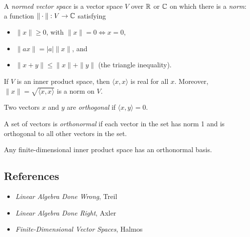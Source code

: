 \begin{defn}
  A \emph{normed vector space} is a vector space $V$ over $\mathbb{R}$ or $\mathbb{C}$
  on which there is a \emph{norm}: a function $\|\cdot\|:V\to\mathbb{C}$ satisfying
  \begin{itemize}
    \item $\| x\|\ge 0$, with $\|x\|=0\iff x=0$,
    \item $\|a x\|=|a|\| x\|$, and
    \item $\| x+ y\|\le\| x\|+\| y\|$ (the triangle
      inequality).
  \end{itemize}
\end{defn}
\begin{prop}
  If $V$ is an inner product space, then $\langle x, x\rangle$ is
  real for all $ x$.
  Moreover, $\| x\|=\sqrt{\langle x, x\rangle}$ is a norm
  on $V$.
\end{prop}
\begin{defn}
  Two vectors $ x$ and $ y$ are \emph{orthogonal} if $\langle
   x, y\rangle=0$.

  A set of vectors is \emph{orthonormal} if each vector in the set has norm 1
  and is orthogonal to all other vectors in the set.
\end{defn}
\begin{prop}
  Any finite-dimensional inner product space has an orthonormal basis.
\end{prop}

\subsection*{References}
\begin{itemize}
  \item \emph{Linear Algebra Done Wrong}, Treil
  \item \emph{Linear Algebra Done Right}, Axler
  \item \emph{Finite-Dimensional Vector Spaces}, Halmos
\end{itemize}
